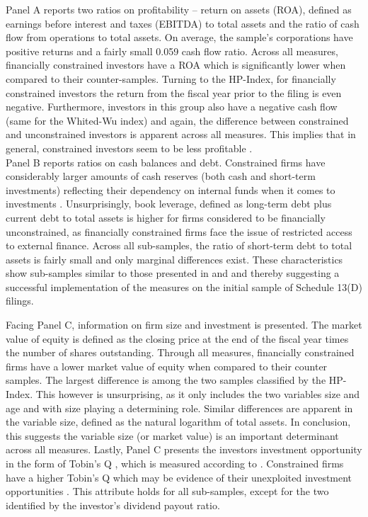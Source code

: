 \documentclass[12pt]{article}
\begin{document}
Panel A reports two ratios on profitability -- return on assets (ROA), defined as earnings before interest and taxes (EBITDA) to total assets and the ratio of cash flow from operations to total assets. On average, the sample's corporations have positive returns and a fairly small 0.059 cash flow ratio. Across all measures, financially constrained investors have a ROA which is significantly lower when compared to their counter-samples. Turning to the HP-Index, for financially constrained investors the return from the fiscal year prior to the filing is even negative. Furthermore, investors in this group also have a negative cash flow (same for the Whited-Wu index) and again, the difference between constrained and unconstrained investors is apparent across all measures. This implies that in general, constrained investors seem to be less profitable \citet[p.544]{Whited2006}.\\
Panel B reports ratios on cash balances and debt. Constrained firms have considerably larger amounts of cash reserves (both cash and short-term investments) reflecting their dependency on internal funds when it comes to investments \citep[p.142]{Fazzari1988}. Unsurprisingly, book leverage, defined as long-term debt plus current debt to total assets \citep[p.1440]{MacKay2005} is higher for firms considered to be financially unconstrained, as financially constrained firms face the issue of restricted access to external finance. Across all sub-samples, the ratio of short-term debt to total assets is fairly small and only marginal differences exist. These characteristics show sub-samples similar to those presented in \citet[p.544]{Whited2006} and \citet[p.1917]{hadlock2010} and thereby suggesting a successful implementation of the measures on the initial sample of Schedule 13(D) filings.

%
Facing Panel C, information on firm size and investment is presented. The market value of equity is defined as the closing price at the end of the fiscal year times the number of shares outstanding. Through all measures, financially constrained firms have a lower market value of equity when compared to their counter samples. The largest difference is among the two samples classified by the HP-Index. This however is unsurprising, as it only includes the two variables size and age and with size playing a determining role. Similar differences are apparent in the variable size, defined as the natural logarithm of total assets. In conclusion, this suggests the variable size (or market value) is an important determinant across all measures. Lastly, Panel C presents the investors investment opportunity in the form of Tobin's Q \citep[p.1441]{MacKay2005}, which is measured according to \citet[p.1]{Khatami2014}. Constrained firms have a higher Tobin's Q which may be evidence of their unexploited investment opportunities \citep[p.539]{Whited2006}. This attribute holds for all sub-samples, except for the two identified by the investor's dividend payout ratio. 
\end{document}
